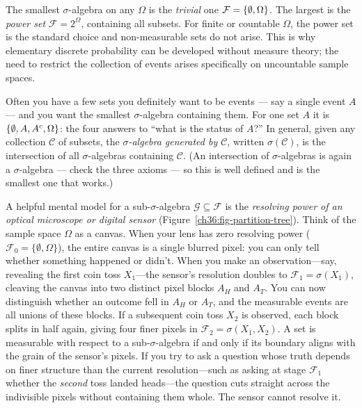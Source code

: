 \begin{example}
\label{ch36:extremes}
The smallest $\sigma$-algebra on any $\Omega$ is the \emph{trivial} one
$\mathcal{F} = \{\emptyset, \Omega\}$.
The largest is the \emph{power set} $\mathcal{F} = 2^{\Omega}$, containing all subsets.
For finite or countable $\Omega$, the power set is the standard choice and non-measurable
sets do not arise. This is why elementary discrete probability can be developed without
measure theory; the need to restrict the collection of events arises specifically on
uncountable sample spaces.
\end{example}

\begin{example}
\label{ch36:generated}
Often you have a few sets you definitely want to be events --- say a single
event $A$ --- and you want the smallest $\sigma$-algebra containing them. For one
set $A$ it is $\{\emptyset, A, A^c, \Omega\}$: the four answers to ``what is the
status of $A$?'' In general, given any collection $\mathcal{C}$ of subsets, the
\emph{$\sigma$-algebra generated by $\mathcal{C}$}, written $\sigma(\mathcal{C})$,
is the intersection of all $\sigma$-algebras containing $\mathcal{C}$. (An
intersection of $\sigma$-algebras is again a $\sigma$-algebra --- check the three
axioms --- so this is well defined and is the smallest one that works.)

A helpful mental model for a sub-$\sigma$-algebra $\mathcal{G} \subseteq \mathcal{F}$ is the \emph{resolving power of an optical microscope or digital sensor} (Figure~\ref{ch36:fig-partition-tree}). Think of the sample space $\Omega$ as a canvas. When your lens has zero resolving power ($\mathcal{F}_0 = \{\emptyset, \Omega\}$), the entire canvas is a single blurred pixel: you can only tell whether something happened or didn't. When you make an observation---say, revealing the first coin toss $X_1$---the sensor's resolution doubles to $\mathcal{F}_1 = \sigma(X_1)$, cleaving the canvas into two distinct pixel blocks $A_H$ and $A_T$. You can now distinguish whether an outcome fell in $A_H$ or $A_T$, and the measurable events are all unions of these blocks. If a subsequent coin toss $X_2$ is observed, each block splits in half again, giving four finer pixels in $\mathcal{F}_2 = \sigma(X_1, X_2)$.
A set is measurable with respect to a sub-$\sigma$-algebra if and only if its boundary aligns with the grain of the sensor's pixels. If you try to ask a question whose truth depends on finer structure than the current resolution---such as asking at stage $\mathcal{F}_1$ whether the \emph{second} toss landed heads---the question cuts straight across the indivisible pixels without containing them whole. The sensor cannot resolve it.
\end{example}

